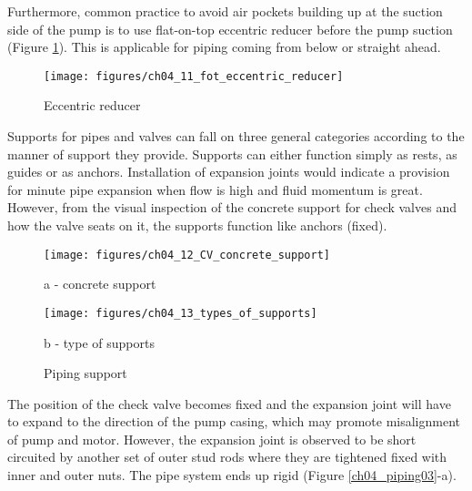 Furthermore, common practice to avoid air pockets building up at the suction side of the pump is to use flat-on-top eccentric reducer before the pump suction (Figure \ref{ch04_tbl_ch04_11_fot_eccentric_reducer}). This is applicable for piping coming from below or straight ahead. 

\begin{figure}[h]
	\texttt{[image: figures/ch04\_11\_fot\_eccentric\_reducer]} 
	\caption{Eccentric reducer}
	\label{ch04_tbl_ch04_11_fot_eccentric_reducer}
\end{figure}

Supports for pipes and valves can fall on three general categories according to the manner of support they provide. Supports can either function simply as rests, as guides or as anchors. Installation of expansion joints would indicate a provision for minute pipe expansion when flow is high and fluid momentum is great. However, from the visual inspection of the concrete support for check valves and how the valve seats on it, the supports function like anchors (fixed).


\begin{figure}[!htb]
	\begin{minipage}[b]{0.3\linewidth}
		\centering
		\texttt{[image: figures/ch04\_12\_CV\_concrete\_support]}
		\caption*{a - concrete support}
	\end{minipage}
	\hspace{0.05cm}
	\begin{minipage}[b]{0.6\linewidth}
		\centering
		\texttt{[image: figures/ch04\_13\_types\_of\_supports]}
		\caption*{b - type of supports}
	\end{minipage}
	\caption{Piping support}
	\label{ch04_piping02}
\end{figure}


The position of the check valve becomes fixed and the expansion joint will have to expand to the direction of the pump casing, which may promote misalignment of pump and motor. However, the expansion joint is observed to be short circuited by another set of outer stud rods where they are tightened fixed with inner and outer nuts. The pipe system ends up rigid (Figure \ref{ch04_piping03}-a).

